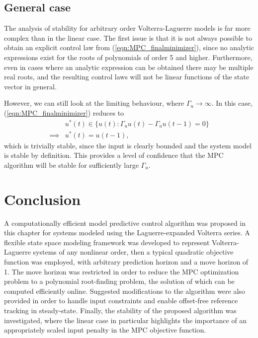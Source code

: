 \subsection{General case}

The analysis of stability for arbitrary order Volterra-Laguerre models is far more complex than in the linear case. The first issue is that it is not always possible to obtain an explicit control law from (\ref{eqn:MPC_finalminimizer}), since no analytic expressions exist for the roots of polynomials of order 5 and higher. Furthermore, even in cases where an analytic expression can be obtained there may be multiple real roots, and the resulting control laws will not be linear functions of the state vector in general.

However, we can still look at the limiting behaviour, where $\Gamma_u \rightarrow \infty$. In this case, (\ref{eqn:MPC_finalminimizer}) reduces to
\begin{align}
&u^*(t) \in   \Bigg\{ u(t): \Gamma_u u(t)  - \Gamma_u u(t-1) = 0 \Bigg\} \\
\implies & u^*(t) = u(t-1),
\end{align}
which is trivially stable, since the input is clearly bounded and the system model is stable by definition. This provides a level of confidence that the MPC algorithm will be stable for sufficiently large $\Gamma_u$.

\section{Conclusion}

A computationally efficient model predictive control algorithm was proposed in this chapter for systems modeled using the Laguerre-expanded Volterra series. A flexible state space modeling framework was developed to represent Volterra-Laguerre systems of any nonlinear order, then a typical quadratic objective function was employed, with arbitrary prediction horizon and a move horizon of 1. The move horizon was restricted in order to reduce the MPC optimization problem to a polynomial root-finding problem, the solution of which can be computed efficiently online. Suggested modifications to the algorithm were also provided in order to handle input constraints and enable offset-free reference tracking in steady-state. Finally, the stability of the proposed algorithm was investigated, where the linear case in particular highlights the importance of an appropriately scaled input penalty in the MPC objective function.